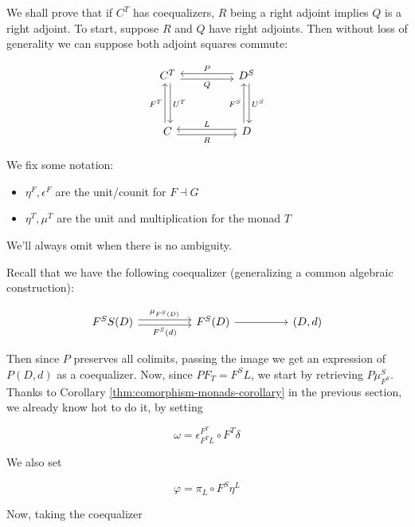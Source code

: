 \documentclass[10pt, oneside]{article}
\begin{document}
We shall prove that if $C^T$ has coequalizers, $R$ being a right adjoint implies $Q$ is a right adjoint. To start, suppose $R$ and $Q$ have right adjoints. Then without loss of generality we can suppose both adjoint squares commute:

\[\begin{tikzcd}[ampersand replacement=\&]
	{C^T} \&\& {D^S} \\
	\\
	C \&\& D
	\arrow["Q"', shift right, from=1-1, to=1-3]
	\arrow["R"', shift right, from=3-1, to=3-3]
	\arrow["{U^T}", shift left, from=1-1, to=3-1]
	\arrow["{U^S}", shift left, from=1-3, to=3-3]
	\arrow["{F^T}", shift left, from=3-1, to=1-1]
	\arrow["{F^S}", shift left, from=3-3, to=1-3]
	\arrow["P"', shift right, from=1-3, to=1-1]
	\arrow["L"', shift right, from=3-3, to=3-1]
\end{tikzcd}\]

We fix some notation:

\begin{itemize}
    \item $\eta^F, \epsilon^F$ are the unit/counit for $F \dashv G$

    \item $\eta^T, \mu^T$ are the unit and multiplication for the monad $T$
\end{itemize}

We'll always omit when there is no ambiguity.

Recall that we have the following coequalizer (generalizing a common algebraic construction):

\[\begin{tikzcd}[ampersand replacement=\&]
	{F^S S(D)} \&\& {F^S(D)} \&\& {(D, d)}
	\arrow["{\mu_{F^S(D)}}", shift left, from=1-1, to=1-3]
	\arrow["{F^S(d)}"', shift right, from=1-1, to=1-3]
	\arrow[from=1-3, to=1-5]
\end{tikzcd}\]

Then since $P$ preserves all colimits, passing the image we get an expression of $P(D, d)$ as a coequalizer. Now, since $P F_T = F^S L$, we start by retrieving $P \mu^S_{F^S}$. Thanks to Corollary \ref{thm:comorphism-monads-corollary} in the previous section, we already know hot to do it, by setting

$$\omega = \epsilon^{F^T}_{F^TL} \circ F^T \delta$$

We also set

$$\varphi = \pi_L \circ F^S \eta^L$$

Now, taking the coequalizer
\end{document}
